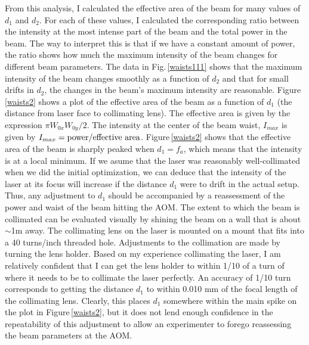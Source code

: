 From this analysis, I calculated the effective area of the beam for many values of $d_1$ and $d_2$. For each of these values, I calculated the corresponding ratio between the intensity at the most intense part of the beam and the total power in the beam. The way to interpret this is that if we have a constant amount of power, the ratio shows how much the maximum intensity of the beam changes for different beam parameters. The data in Fig.\,\ref{waists111} shows that the maximum intensity of the beam changes smoothly as a function of $d_2$ and that for small drifts in $d_2$, the changes in the beam's maximum intensity are reasonable. 
Figure\,\ref{waists2} shows a plot of the effective area of the beam as a function of $d_1$ (the distance from laser face to collimating lens). The effective area is given by the expression $\pi W_{0x}W_{0y}/2$. The intensity at the center of the beam waist, $I_{max}$ is given by $I_{max}=\textnormal{power}/\textnormal{effective area}$. Figure\,\ref{waists2} shows that the effective area of the beam is sharply peaked when $d_1=f_a$, which means that the intensity is at a local minimum. If we asume that the laser was reasonably well-collimated when we did the initial optimization, we can deduce that the intensity of the laser at its focus will increase if the distance $d_1$ were to drift in the actual setup. Thus, any adjustment to $d_1$ should be accompanied by a reassessment of the power and waist of the beam hitting the AOM. The extent to which the beam is collimated can be evaluated visually by shining the beam on a wall that is about $\sim$1m away. The collimating lens on the laser is mounted on a mount that fits into a 40 turns/inch threaded hole. Adjustments to the collimation are made by turning the lens holder.  Based on my experience collimating the laser, I am relatively confident that I can get the lens holder to within 1/10 of a turn of where it needs to be to collimate the laser perfectly.  An accuracy of 1/10 turn corresponds to getting the distance $d_1$ to within 0.010 mm of the focal length of the collimating lens. Clearly, this places $d_1$ somewhere within the main spike on the plot in Figure\,\ref{waists2}, but it does not lend enough confidence in the repeatability of this adjustment to allow an experimenter to forego reassessing the beam parameters at the AOM. 

